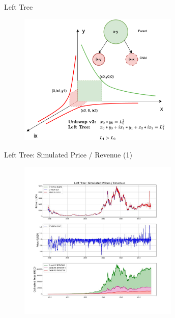 \documentclass[10pt,xcolor=svgnames]{beamer} %
\begin{document}
\begin{frame}{Left Tree}

\begin{figure}[h!]
\includegraphics[width=3in]{img/left_tree.png}
\label{fig:left_tree}
\end{figure}

\end{frame}


\begin{frame}{Left Tree: Simulated Price / Revenue (1)}

\begin{figure}[h!]
\includegraphics[width=3in]{img/simulation.jpg}
\label{fig:simulation}
\end{figure}

\end{frame}
\end{document}
